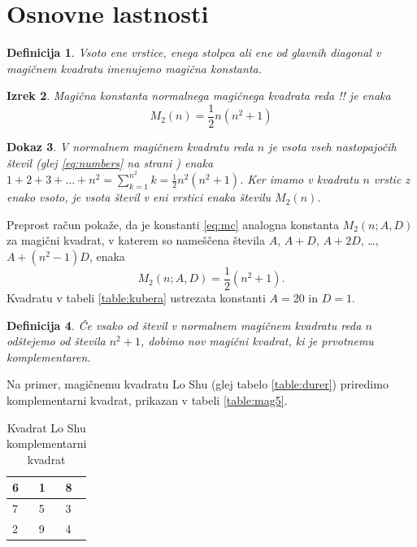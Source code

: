 \documentclass[a4paper,12pt]{article}
\newtheorem{izrek}{Izrek}[section]
\newtheorem{dokaz}[izrek]{Dokaz}
\newtheorem{definicija}[izrek]{Definicija}
\begin{document}
\section{Osnovne lastnosti}

\begin{definicija}
      Vsoto ene vrstice, enega stolpca ali ene od glavnih diagonal
      v magičnem kvadratu imenujemo \emph{magična konstanta}.
\end{definicija}


\begin{izrek}
   Magična konstanta normalnega magičnega kvadrata reda !!
   je enaka
   \begin{equation}
     \label{eq:mc} 
      M_2(n) = \frac{1}{2} n(n^2+1)
   \end{equation}
\end{izrek}


\begin{dokaz}
   V normalnem magičnem kvadratu reda $n$ je vsota vseh nastopajočih
   števil (glej \ref{eq:numbers} na strani \pageref{eq:numbers}) enaka
   $1+2+3+\dots+n^2=\sum_{k=1}^{n^2}k=\frac{1}{2}n^2(n^2+1)$. Ker imamo
   v kvadratu $n$ vrstic z enako vsoto, je vsota števil v eni vrstici
   enaka številu $M_2(n)$.
\end{dokaz}

Preprost račun pokaže, da je konstanti \ref{eq:mc} analogna konstanta
$M_2(n;A,D)$ za magični kvadrat, v katerem so nameščena števila
$A$, $A+D$, $A+2D$, \dots, $A+(n^2-1)D$, enaka 
\[
M_2(n;A,D)=\frac{1}{2}(n^2 + 1).
\]
Kvadratu v tabeli \ref{table:kubera} ustrezata konstanti $A=20$ in $D=1$.

\begin{definicija}
      Če vsako od števil v normalnem magičnem kvadratu reda $n$ odštejemo
      od števila $n^2+1$, dobimo nov magični kvadrat, ki je prvotnemu
      \emph{komplementaren}.
\end{definicija}

Na primer, magičnemu kvadratu Lo Shu (glej tabelo \ref{table:durer}) priredimo
komplementarni kvadrat, prikazan v tabeli \ref{table:mag5}.
%


\begin{table}[ht!]
   \centering
   \caption{Kvadrat Lo Shu komplementarni kvadrat}
   \begin{tabular}{|l|l|l|}
      \hline
      6 & 1 & 8 \\\hline
      7 & 5 & 3 \\\hline
      2 & 9 & 4 \\\hline
   \end{tabular}
   \label{table:closhu}
\end{table}
\end{document}
